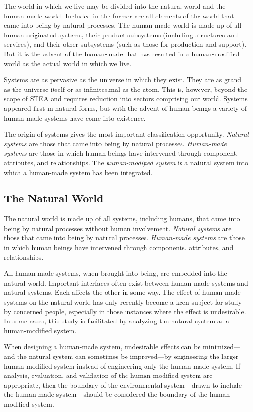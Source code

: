The world in which we live may be divided into the natural world and the human-made world.  Included in the former are all elements of the world that came into being by natural processes. The human-made world is made up of all human-originated systems, their product subsystems (including structures and services), and their other subsystems (such as those for production and support).  But it is the advent of the human-made that has resulted in a human-modified world as the actual world in which we live.

Systems are as pervasive as the universe in which they exist.  They are as grand as the universe itself or as infinitesimal as the atom.  This is, however, beyond the scope of STEA and requires reduction into sectors comprising our world.  Systems appeared first in natural forms, but with the advent of human beings a variety of human-made systems have come into existence.

The origin of systems gives the most important classification opportunity.  \textit{Natural systems} are those that came into being by natural processes.  \textit{Human-made systems} are those in which human beings have intervened through component, attributes, and relationships.  The \textit{human-modified system} is a natural system into which a human-made system has been integrated.

\subsection{The Natural World}\label{sec:NaturalWorld}

The natural world is made up of all systems, including humans, that came into being by natural processes without human involvement. \textit{Natural systems} are those that came into being by natural processes. \textit{Human-made systems} are those in which human beings have intervened through components, attributes, and relationships. 

All human-made systems, when brought into being, are embedded into the natural world. Important interfaces often exist between human-made systems and natural systems. Each affects the other in some way. The effect of human-made systems on the natural world has only recently become a keen subject for study by concerned people, especially in those instances where the effect is undesirable. In some cases, this study is facilitated by analyzing the natural system as a human-modified system.

When designing a human-made system, undesirable effects can be minimized—and the natural system can sometimes be improved—by engineering the larger human-modified system instead of engineering only the human-made system. If analysis, evaluation, and validation of the human-modified system are appropriate, then the boundary of the environmental system—drawn to include the human-made system—should be considered the boundary of the human-modified system.

